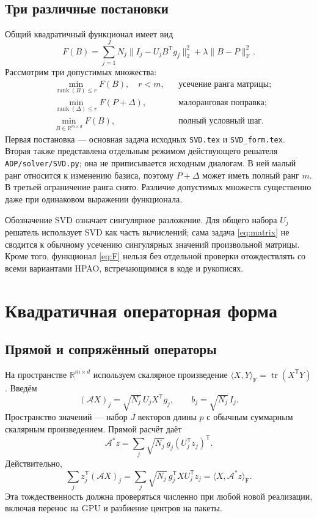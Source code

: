 \documentclass[11pt,a4paper]{article}
\numberwithin{equation}{section}
\theoremstyle{remark}
\newcommand{\R}{\mathbb R}
\newcommand{\T}{^{\mathsf T}}
\newcommand{\F}{_{\mathrm F}}
\newcommand{\ip}[2]{\langle #1,#2\rangle_{\mathrm F}}
\DeclareMathOperator{\rank}{rank}
\DeclareMathOperator{\tr}{tr}
\newcommand{\src}[1]{\nolinkurl{#1}}
\begin{document}
\subsection{Три различные постановки}\label{sec:variants}
Общий квадратичный функционал имеет вид
\begin{equation}\label{eq:F}
 F(B)=\sum_{j=1}^J N_j\|I_j-U_jB\T g_j\|_2^2
       +\lambda\|B-P\|\F^2.
\end{equation}
Рассмотрим три допустимых множества:
\begin{align}
 &\min_{\rank(B)\le r} F(B),\quad r<m,
 &&\text{усечение ранга матрицы};\label{eq:matrix}\\
 &\min_{\rank(\Delta)\le r} F(P+\Delta),
 &&\text{малоранговая поправка};\label{eq:correction}\\
 &\min_{B\in\R^{m\times d}} F(B),
 &&\text{полный условный шаг}.\label{eq:full}
\end{align}
Первая постановка --- основная задача исходных \src{SVD.tex} и
\src{SVD_form.tex}. Вторая также представлена отдельным режимом действующего
решателя \src{ADP/solver/SVD.py}; она не приписывается исходным диалогам.
В ней малый ранг относится к изменению базиса,
поэтому $P+\Delta$ может иметь полный ранг $m$. В третьей ограничение ранга
снято. Различие допустимых множеств существенно даже при одинаковом
выражении функционала.

Обозначение SVD означает сингулярное разложение. Для общего набора $U_j$
решатель использует SVD как часть вычислений; сама задача \eqref{eq:matrix}
не сводится к обычному усечению сингулярных значений произвольной матрицы.
Кроме того, функционал \eqref{eq:F} нельзя без отдельной проверки отождествлять
со всеми вариантами HPAO, встречающимися в коде и рукописях.

\section{Квадратичная операторная форма}\label{sec:operator}

\subsection{Прямой и сопряжённый операторы}
На пространстве $\R^{m\times d}$ используем скалярное произведение
$\ip{X}{Y}=\tr(X\T Y)$. Введём
\begin{equation}\label{eq:A}
 (\mathcal A X)_j=\sqrt{N_j}\,U_jX\T g_j,
 \qquad b_j=\sqrt{N_j}\,I_j.
\end{equation}
Пространство значений --- набор $J$ векторов длины $p$ с обычным
суммарным скалярным произведением. Прямой расчёт даёт
\begin{equation}\label{eq:adjoint}
 \mathcal A^* z=\sum_j\sqrt{N_j}\,g_j(U_j\T z_j)\T.
\end{equation}
Действительно,
\[
 \sum_j z_j\T(\mathcal A X)_j
 =\sum_j\sqrt{N_j}\,g_j\T XU_j\T z_j
 =\ip{X}{\mathcal A^*z}.
\]
Эта тождественность должна проверяться численно при любой новой реализации,
включая перенос на GPU и разбиение центров на пакеты.
\end{document}
